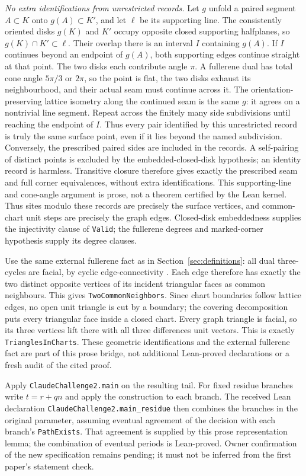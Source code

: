 \documentclass[11pt]{amsart}
\newcommand{\record}[1]{\nolinkurl{#1}}
\theoremstyle{definition}\newtheorem{definition}{Definition}
\begin{document}
\emph{No extra identifications from unrestricted records.}
Let $g$ unfold a paired segment $A\subset K$ onto $g(A)\subset K'$,
and let $\ell$ be its supporting line. The consistently oriented disks
$g(K)$ and $K'$ occupy opposite closed supporting halfplanes, so
$g(K)\cap K'\subset\ell$. Their overlap there is an interval $I$
containing $g(A)$. If $I$ continues beyond an endpoint of $g(A)$,
both supporting edges continue straight at that point. The two disks
each contribute angle $\pi$. A fullerene dual has total cone angle
$5\pi/3$ or $2\pi$, so the point is flat, the two disks exhaust its
neighbourhood, and their actual seam must continue across it. The
orientation-preserving lattice isometry along the continued seam is
the same $g$: it agrees on a nontrivial line segment. Repeat across
the finitely many side subdivisions until reaching the endpoint of
$I$. Thus every pair identified by this unrestricted record is truly
the same surface point, even if it lies beyond the named subdivision.
Conversely, the prescribed paired sides are included in the records.
A self-pairing of distinct points is excluded by the embedded-closed-disk
hypothesis; an identity record is harmless. Transitive closure therefore
gives exactly the prescribed seam and full corner equivalences, without
extra identifications. This supporting-line and cone-angle argument is
prose, not a theorem certified by the Lean kernel. Thus sites
modulo these records are precisely the surface vertices, and common-chart
unit steps are precisely the graph edges. Closed-disk embeddedness
supplies the injectivity clause of \record{Valid}; the fullerene degrees
and marked-corner hypothesis supply its degree clauses.

Use the same external fullerene fact as in Section~\ref{sec:definitions}:
all dual three-cycles are facial, by cyclic edge-connectivity
\cite{Connectivity}. Each edge therefore has exactly the two distinct
opposite vertices of its incident triangular faces as common neighbours.
This gives \record{TwoCommonNeighbors}. Since chart boundaries follow
lattice edges, no open unit triangle is cut by a boundary; the covering
decomposition puts every triangular face inside a closed chart.
Every graph triangle is facial, so its three vertices lift there with
all three differences unit vectors. This is exactly
\record{TrianglesInCharts}. These geometric identifications and the
external fullerene fact are part of this prose bridge, not additional
Lean-proved declarations or a fresh audit of the cited proof.

Apply \record{ClaudeChallenge2.main} on the resulting tail. For fixed
residue branches write $t=r+qn$ and apply the construction to each
branch. The received Lean declaration \record{ClaudeChallenge2.main_residue}
then combines the branches in the original parameter, assuming eventual
agreement of the decision with each branch's \record{PathExists}.
That agreement is supplied by this prose representation lemma;
the combination of eventual periods is Lean-proved.
Owner confirmation of the new specification remains pending;
it must not be inferred from the first paper's statement check.
\end{document}
